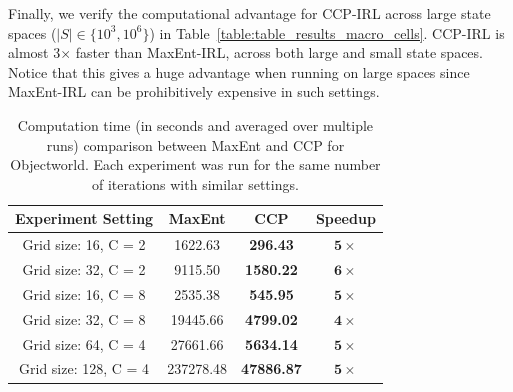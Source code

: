 \documentclass{article}
\begin{document}

Finally, we verify the computational advantage for CCP-IRL across large state spaces ($|S| \in \{10^3, 10^6\}$) in Table~\ref{table:table_results_macro_cells}. CCP-IRL is almost 3$\times$ faster than MaxEnt-IRL, across both large and small state spaces. Notice that this gives a huge advantage when running on large spaces since MaxEnt-IRL can be prohibitively expensive in such settings.


\begin{table}[t]
\centering
\def\arraystretch{1.2}%
\begin{tabular}{|c|c|c|c|}
\hline
Experiment Setting & MaxEnt & CCP & Speedup \\\hline

Grid size: 16, C = 2 & 1622.63 & \textbf{296.43} & $\mathbf{5}\times$ \\
Grid size: 32, C = 2 & 9115.50 & \textbf{1580.22} & $\mathbf{6}\times$ \\
Grid size: 16, C = 8 & 2535.38  & \textbf{545.95} & $\mathbf{5}\times$ \\
Grid size: 32, C = 8 & 19445.66 & \textbf{4799.02} & $\mathbf{4}\times$ \\
Grid size: 64, C = 4 & 27661.66 & \textbf{5634.14} & $\mathbf{5}\times$ \\
Grid size: 128, C = 4 & 237278.48 & \textbf{47886.87} & $\mathbf{5}\times$ \\
\hline
\end{tabular}
\caption{Computation time (in seconds and averaged over multiple runs) comparison between MaxEnt and CCP for Objectworld. Each experiment was run for the same number of iterations with similar settings. }
\label{table:table_results_objectworld}
\end{table}
\end{document}
